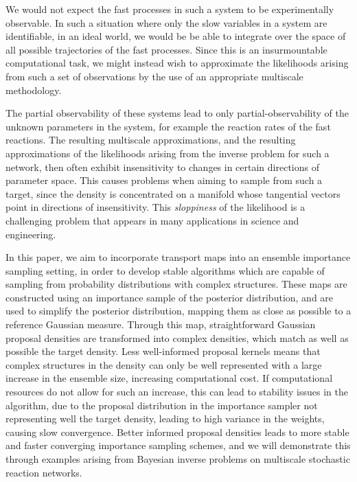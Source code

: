 \documentclass[final]{siamltex}
\begin{document}
We would not expect the fast processes in such a system to be
experimentally observable. In such a situation where only the slow
variables in a system are identifiable, in an ideal world, we would be
be able to integrate over the space of all possible trajectories of
the fast processes. Since this is an insurmountable computational
task, we might instead wish to approximate the likelihoods arising
from such a set of observations by the use of an appropriate
multiscale methodology.

The partial observability of these systems lead to only
partial-observability of the unknown parameters in the system, for
example the reaction rates of the fast reactions. The resulting
multiscale approximations, and the resulting approximations of the
likelihoods arising from the inverse problem for such a network, then
often exhibit 
insensitivity to changes in certain directions of
parameter space. This causes problems when aiming to sample from such
a target, since the density is concentrated on a manifold whose
tangential vectors point in directions of insensitivity. This
\emph{sloppiness}\cite{gutenkunst2007universally,apgar2010sloppy} of the likelihood is a challenging problem
that appears in many applications in science and engineering\cite{constantine2014active}.

In this paper, we aim to incorporate transport maps into an ensemble
importance sampling setting, in order to develop stable algorithms which are
capable of sampling from probability distributions with complex
structures. These maps are constructed using an importance sample of
the posterior distribution, and are used to simplify the posterior
distribution, mapping them as close as possible to a reference
Gaussian measure. Through this map, straightforward Gaussian proposal
densities are transformed into complex densities, which match as well
as possible the target density. Less well-informed proposal kernels means that complex
structures in the density can only be well represented with a large
increase in the ensemble size, increasing computational cost. If
computational resources do not allow for such an increase, this can
lead to stability issues in the algorithm, due to the proposal
distribution in the importance sampler not representing well the
target density, leading to high variance in the weights, causing slow
convergence. Better informed proposal densities
leads to more stable and faster converging importance sampling
schemes, and we will demonstrate this through examples
arising from Bayesian inverse problems on multiscale stochastic
reaction networks.
\end{document}
